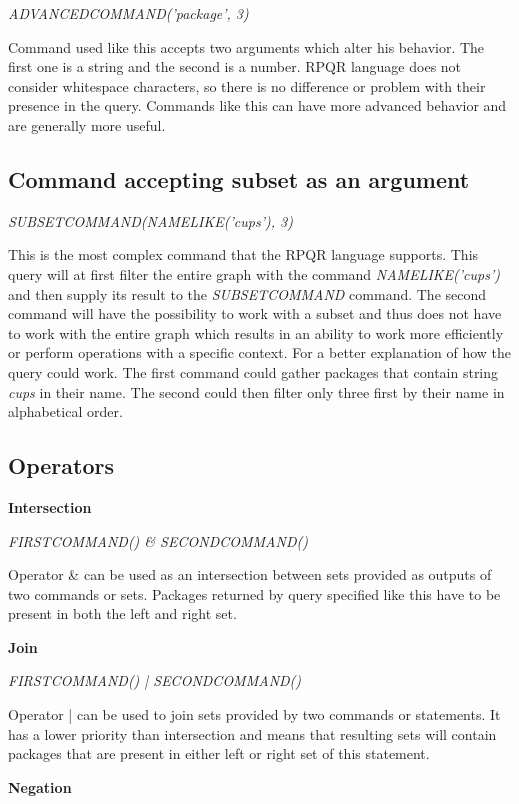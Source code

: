 \textit{ADVANCEDCOMMAND('package', 3)}

Command used like this accepts two arguments which alter his behavior. The first one is a string
and the second is a number. RPQR language does not consider whitespace characters, so there is no
difference or problem with their presence in the query. Commands like this can have more advanced
behavior and are generally more useful.

\subsection*{Command accepting subset as an argument}

\textit{SUBSETCOMMAND(NAMELIKE('cups'), 3)}

This is the most complex command that the RPQR language supports. This query will at first filter the
entire graph with the command \textit{NAMELIKE('cups')} and then supply its result to the \textit{SUBSETCOMMAND}
command. The second command will have the possibility to work with a subset and thus does not have to
work with the entire graph which results in an ability to work more efficiently or perform operations
with a specific context. For a better explanation of how the query could work. The first command could
gather packages that contain string \textit{cups} in their name. The second could then filter only
three first by their name in alphabetical order.

\newpage

\subsection*{Operators}

\textbf{Intersection}

\textit{FIRSTCOMMAND() \& SECONDCOMMAND()}

Operator \& can be used as an intersection between sets provided as outputs of two commands or sets.
Packages returned by query specified like this have to be present in both the left and right set.

\textbf{Join}

\textit{FIRSTCOMMAND() | SECONDCOMMAND()}

Operator | can be used to join sets provided by two commands or statements. It has a lower priority
than intersection and means that resulting sets will contain packages that are present in either
left or right set of this statement.

\textbf{Negation}

